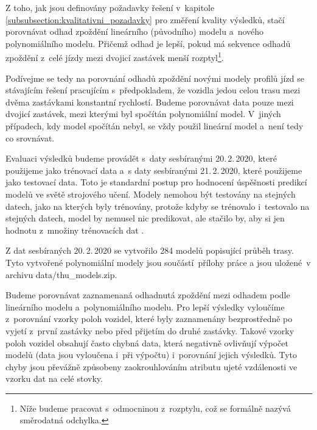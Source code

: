 Z toho, jak jsou definovány požadavky řešení v~kapitole \ref{subsubsection:kvalitativni_pozadavky} pro změření kvality výsledků, stačí porovnávat odhad zpoždění lineárního (původního) modelu a~nového polynomiálního modelu. Přičemž odhad je lepší, pokud má sekvence odhadů zpoždění z~celé jízdy mezi dvojicí zastávek menší rozptyl\footnote{Níže budeme pracovat s~odmocninou z~rozptylu, což se formálně nazývá směrodatná odchylka.}.


\bigbreak

Podívejme se tedy na porovnání odhadů zpoždění novými modely profilů jízd se stávajícím řešení pracujícím s~předpokladem, že vozidla jedou celou trasu mezi dvěma zastávkami konstantní rychlostí. Budeme porovnávat data pouze mezi dvojicí zastávek, mezi kterými byl spočítán polynomiální model. V~jiných případech, kdy model spočítán nebyl, se vždy použil lineární model a~není tedy co srovnávat.


\bigbreak

Evaluaci výsledků budeme provádět s~daty sesbíranými 20.\,2.\,2020, které použijeme jako trénovací data a~s daty sesbíranými 21.\,2.\,2020, které použijeme jako testovací data. Toto je standardní postup pro hodnocení úspěšnosti predikcí modelů ve světě strojového učení. Modely nemohou být testovány na stejných datech, jako na kterých byly trénovány, protože kdyby se trénovalo i~testovalo na stejných datech, model by nemusel nic predikovat, ale stačilo by, aby si jen  hodnotu z~množiny trénovacích dat \citep[viz][Strana 30]{Gareth13}.

\bigbreak

Z dat sesbíraných 20.\,2.\,2020 se vytvořilo 284 modelů popisující průběh trasy. Tyto vytvořené polynomiální modely jsou součástí přílohy práce a jsou uložené v archivu data/thu_models.zip.


\bigbreak

Budeme porovnávat zaznamenaná odhadnutá zpoždění mezi odhadem podle lineárního modelu a~polynomiálního modelu. Pro lepší výsledky vyloučíme z~porovnání vzorky poloh vozidel, které byly zaznamenány bezprostředně po vyjetí z~první zastávky nebo před přijetím do druhé zastávky. Takové vzorky poloh vozidel obsahují často chybná data, která negativně ovlivňují výpočet modelů (data jsou vyloučena i~při výpočtu) i~porovnání jejich výsledků. Tyto chyby jsou převážně způsobeny zaokrouhlováním atributu ujeté vzdálenosti ve vzorku dat na celé stovky.

\bigbreak

